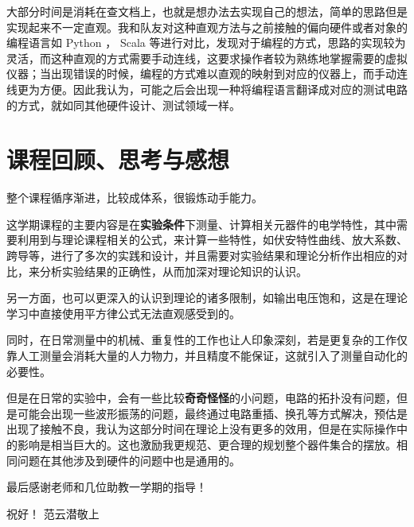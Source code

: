 \documentclass[lang=cn,11pt,a4paper,cite=authoryear]{elegantpaper}
\begin{document}
大部分时间是消耗在查文档上，也就是想办法去实现自己的想法，简单的思路但是实现起来不一定直观。我和队友对这种直观方法与之前接触的偏向硬件或者对象的编程语言如 Python ， Scala 等进行对比，发现对于编程的方式，思路的实现较为灵活，而这种直观的方式需要手动连线，这要求操作者较为熟练地掌握需要的虚拟仪器；当出现错误的时候，编程的方式难以直观的映射到对应的仪器上，而手动连线更为方便。因此我认为，可能之后会出现一种将编程语言翻译成对应的测试电路的方式，就如同其他硬件设计、测试领域一样。

\section{课程回顾、思考与感想}

整个课程循序渐进，比较成体系，很锻炼动手能力。

这学期课程的主要内容是在\textbf{实验条件}下测量、计算相关元器件的电学特性，其中需要利用到与理论课程相关的公式，来计算一些特性，如伏安特性曲线、放大系数、跨导等，进行了多次的实践和设计，并且需要对实验结果和理论分析作出相应的对比，来分析实验结果的正确性，从而加深对理论知识的认识。

另一方面，也可以更深入的认识到理论的诸多限制，如输出电压饱和，这是在理论学习中直接使用平方律公式无法直观感受到的。

同时，在日常测量中的机械、重复性的工作也让人印象深刻，若是更复杂的工作仅靠人工测量会消耗大量的人力物力，并且精度不能保证，这就引入了测量自动化的必要性。

但是在日常的实验中，会有一些比较\textbf{奇奇怪怪}的小问题，电路的拓扑没有问题，但是可能会出现一些波形振荡的问题，最终通过电路重插、换孔等方式解决，预估是出现了接触不良，我认为这部分时间在理论上没有更多的效用，但是在实际操作中的影响是相当巨大的。这也激励我更规范、更合理的规划整个器件集合的摆放。相同问题在其他涉及到硬件的问题中也是通用的。

最后感谢老师和几位助教一学期的指导！

\begin{flushleft}
    祝好！
    范云潜敬上
\end{flushleft}
\end{document}
